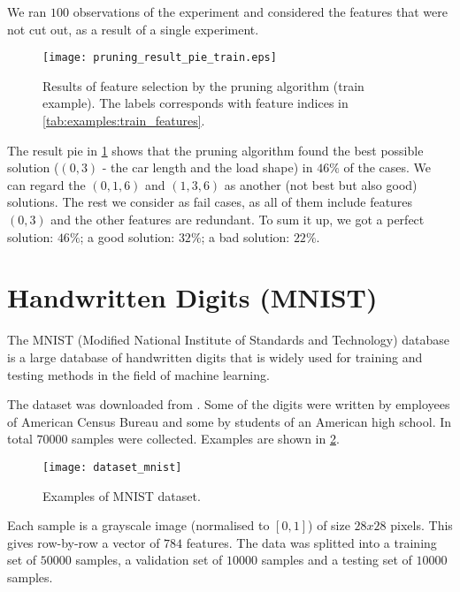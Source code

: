 We ran $ 100 $ observations of the experiment and considered the features that were not cut out, as a result of a single experiment.

\begin{figure}[H]
\centering
\texttt{[image: pruning\_result\_pie\_train.eps]}
\caption{Results of feature selection by the pruning algorithm (train example). The labels corresponds with feature indices in \cref{tab:examples:train_features}.}
\label{fig:examples:pruning_result_pie_train}
\end{figure}

The result pie in \cref{fig:examples:pruning_result_pie_train} shows that the pruning algorithm found the best possible solution ($ (0, 3) $ - the car length and the load shape) in $ 46\% $ of the cases. We can regard the $ (0, 1, 6) $ and $ (1, 3, 6) $ as another (not best but also good) solutions. The rest we consider as fail cases, as all of them include features $ (0, 3) $ and the other features are redundant. To sum it up, we got a perfect solution: $ 46\% $; a good solution: $ 32\% $; a bad solution: $ 22\% $.

\section{Handwritten Digits (MNIST)} \label{sec:example_mnist}
The MNIST (Modified National Institute of Standards and Technology) database \citep{wiki} is a large database of handwritten digits that is widely used for training and testing methods in the field of machine learning. 

The dataset was downloaded from \citep{lecun:mnist}. Some of the digits were written by employees of American Census Bureau \citep{online:census} and some by students of an American high school. In total $ 70000 $ samples were collected. Examples are shown in \cref{fig:examples:dataset_mnist}.

\begin{figure}[H]
\centering
\texttt{[image: dataset\_mnist]}
\caption{Examples of MNIST dataset.}
\label{fig:examples:dataset_mnist}
\end{figure}

Each sample is a grayscale image (normalised to $ [0, 1] $) of size $ 28x28 $ pixels. This gives row-by-row a vector of $ 784 $ features. The data was splitted into a training set of $ 50000 $ samples, a validation set of $ 10000 $ samples and a testing set of $ 10000 $ samples.

